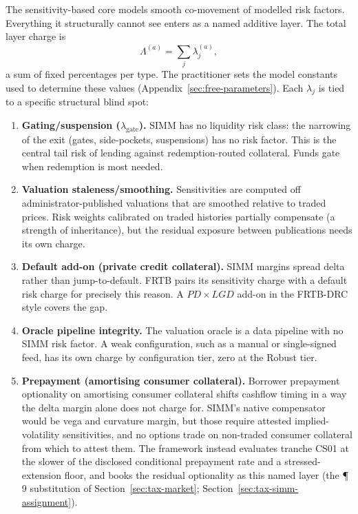 The sensitivity-based core models smooth co-movement of modelled risk factors. Everything it structurally cannot see enters as a named additive layer. The total layer charge is
\begin{equation}\label{eq:layers}
\Lambda^{(a)} = \sum_{j} \lambda_j^{(a)},
\end{equation}
a sum of fixed percentages per type. The practitioner sets the model constants used to determine these values (Appendix~\ref{sec:free-parameters}). Each $\lambda_j$ is tied to a specific structural blind spot:
\begin{enumerate}[label=(\roman*)]
\item \textbf{Gating/suspension ($\lambda_{\mathrm{gate}}$).} SIMM has no liquidity risk class: the narrowing of the exit (gates, side-pockets, suspensions) has no risk factor. This is the central tail risk of lending against redemption-routed collateral. Funds gate when redemption is most needed.
\item \textbf{Valuation staleness/smoothing.} Sensitivities are computed off administrator-published valuations that are smoothed relative to traded prices. Risk weights calibrated on traded histories partially compensate (a strength of inheritance), but the residual exposure between publications needs its own charge.
\item \textbf{Default add-on (private credit collateral).} SIMM margins spread delta rather than jump-to-default. FRTB pairs its sensitivity charge with a default risk charge for precisely this reason. A $PD\times LGD$ add-on in the FRTB-DRC style covers the gap.
\item \textbf{Oracle pipeline integrity.} The valuation oracle is a data pipeline with no SIMM risk factor. A weak configuration, such as a manual or single-signed feed, has its own charge by configuration tier, zero at the Robust tier.
\item \textbf{Prepayment (amortising consumer collateral).} Borrower prepayment optionality on amortising consumer collateral shifts cashflow timing in a way the delta margin alone does not charge for. SIMM's native compensator would be vega and curvature margin, but those require attested implied-volatility sensitivities, and no options trade on non-traded consumer collateral from which to attest them. The framework instead evaluates tranche CS01 at the slower of the disclosed conditional prepayment rate and a stressed-extension floor, and books the residual optionality as this named layer (the \P\,9 substitution of Section~\ref{sec:tax-market}; Section~\ref{sec:tax-simm-assignment}).

\end{enumerate}
